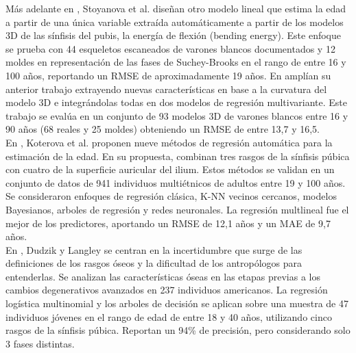 Más adelante en \cite{stoyanova2015enhanced}, Stoyanova et al. diseñan otro modelo lineal que estima la edad a partir de una única variable extraída automáticamente a partir de los modelos 3D de las sínfisis del pubis, la energía de flexión (bending energy). Este enfoque se prueba con 44 esqueletos escaneados de varones blancos documentados y 12 moldes en representación de las fases de Suchey-Brooks \cite{brooks1990skeletal} en el rango de entre 16 y 100 años, reportando un RMSE de aproximadamente 19 años. En \cite{stoyanova2017computational} amplían su anterior trabajo extrayendo nuevas características en base a la curvatura del modelo 3D e integrándolas todas en dos modelos de regresión multivariante. Este trabajo se evalúa en un conjunto de 93 modelos 3D de varones blancos entre 16 y 90 años (68 reales y 25 moldes) obteniendo un RMSE de entre 13,7 y 16,5.\\

En \cite{kotverova2018age}, Koterova et al. proponen nueve métodos de regresión automática para la estimación de la edad. En su propuesta, combinan tres rasgos de la sínfisis púbica con cuatro de la superficie auricular del ilium. Estos métodos se validan en un conjunto de datos de 941 individuos multiétnicos de adultos entre 19 y 100 años. Se consideraron enfoques de regresión clásica, K-NN vecinos cercanos, modelos Bayesianos, arboles de regresión y redes neuronales. La regresión multlineal fue el mejor de los predictores, aportando un RMSE de 12,1 años y un MAE de 9,7 años.\\

En \cite{dudzik2015estimating}, Dudzik y Langley se centran en la incertidumbre que surge de las definiciones de los rasgos óseos y la dificultad de los antropólogos para entenderlas. Se analizan las características óseas en las etapas previas a los cambios degenerativos avanzados en 237 individuos americanos. La regresión logística multinomial y los arboles de decisión se aplican sobre una muestra de 47 individuos jóvenes en el rango de edad de entre 18 y 40 años, utilizando cinco rasgos de la sínfisis púbica. Reportan un 94\% de precisión, pero considerando solo 3 fases distintas.\\

